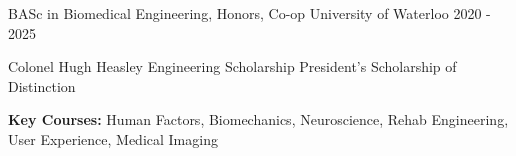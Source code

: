 \documentclass[11pt, a4paper]{russell}
\begin{document}
\makecvheader

\begin{cventries}
    \cventry
        {BASc in Biomedical Engineering, Honors, Co-op} %
        {University of Waterloo} %
        {} %
        {2020 - 2025} %
        {
          \begin{cvitems}
            \item {Colonel Hugh Heasley Engineering Scholarship \textbar{} President's Scholarship of Distinction}
            \item {\textbf{Key Courses:} Human Factors, Biomechanics, Neuroscience, Rehab Engineering, User Experience, Medical Imaging}
          \end{cvitems}
        }
\end{cventries}
\end{document}
